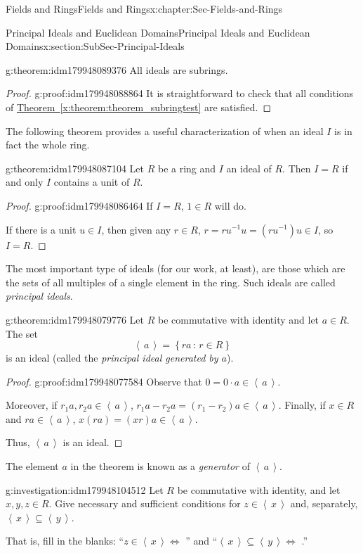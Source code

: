\documentclass[oneside,10pt,]{book}
\newcommand{\xreffont}{\relax}
\numberwithin{equation}{section}
\newcommand{\ideal}[1]{\left\langle\, #1 \,\right\rangle}
\newcommand{\setof}[2]{{\left\{#1\,\colon\,#2\right\}}}
\begin{document}
\begin{chapterptx}{Fields and Rings}{}{Fields and Rings}{}{}{x:chapter:Sec-Fields-and-Rings}
\begin{sectionptx}{Principal Ideals and Euclidean Domains}{}{Principal Ideals and Euclidean Domains}{}{}{x:section:SubSec-Principal-Ideals}
\begin{theorem}{}{}{g:theorem:idm179948089376}
All ideals are subrings.%
\end{theorem}
\begin{proof}{}{g:proof:idm179948088864}
It is straightforward to check that all conditions of \hyperref[x:theorem:theorem_subringtest]{Theorem~{\xreffont\ref{x:theorem:theorem_subringtest}}} are satisfied.%
\end{proof}
The following theorem provides a useful characterization of when an ideal \(I\) is in fact the whole ring.%
\begin{theorem}{}{}{g:theorem:idm179948087104}%
Let \(R\) be a ring and \(I\) an ideal of \(R\). Then \(I = R\) if and only \(I\) contains a unit of \(R\).%
\end{theorem}
\begin{proof}{}{g:proof:idm179948086464}
If \(I = R\), \(1\in R\) will do.%
\par
If there is a unit \(u\in I\), then given any \(r\in R\), \(r = r u^{-1} u = (ru^{-1}) u \in I\), so \(I = R\).%
\end{proof}
The most important type of ideals (for our work, at least), are those which are the sets of all multiples of a single element in the ring. Such ideals are called \emph{principal ideals}.%
\begin{theorem}{}{}{g:theorem:idm179948079776}%
Let \(R\) be commutative with identity and let \(a\in R\). The set%
\begin{equation*}
\ideal{a} = \setof{ra}{r\in R}
\end{equation*}
is an ideal (called the \emph{principal ideal generated by \(a\)}).%
\end{theorem}
\begin{proof}{}{g:proof:idm179948077584}
Observe that \(0 = 0\cdot a \in \ideal{a}\).%
\par
Moreover, if \(r_1 a, r_2 a\in \ideal{a}\), \(r_1 a - r_2 a = (r_1 - r_2)a \in \ideal{a}\). Finally, if \(x\in R\) and \(r a\in \ideal{a}\), \(x (ra) = (xr) a \in \ideal{a}\).%
\par
Thus, \(\ideal{a}\) is an ideal.%
\end{proof}
The element \(a\) in the theorem is known as a \emph{generator} of \(\ideal{a}\).%
\begin{investigation}{}{g:investigation:idm179948104512}%
Let \(R\) be commutative with identity, and let \(x,y,z\in R\). Give necessary and sufficient conditions for \(z\in \ideal{x}\) and, separately, \(\ideal{x} \subseteq \ideal{y}\).%
\par
That is, fill in the blanks: ``\(z\in \ideal{x} \Leftrightarrow\) \textunderscore{}\textunderscore{}\textunderscore{}\textunderscore{}\textunderscore{}\textunderscore{}\textunderscore{}\textunderscore{}\textunderscore{}'' and ``\(\ideal{x}\subseteq \ideal{y} \Leftrightarrow\) \textunderscore{}\textunderscore{}\textunderscore{}\textunderscore{}\textunderscore{}\textunderscore{}\textunderscore{}\textunderscore{}\textunderscore{}.''%

\end{investigation}
\end{sectionptx}
\end{chapterptx}
\end{document}
